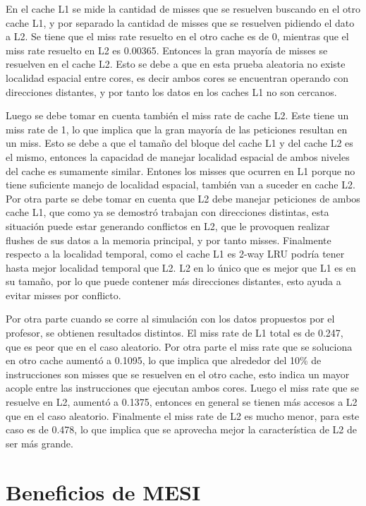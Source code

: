 \documentclass {article}
\begin{document}
En el cache L1 se mide la cantidad de misses que se
resuelven buscando en el otro cache L1, y por separado la cantidad de misses que se resuelven
pidiendo el dato a L2. Se tiene que el miss rate resuelto en el otro cache es de 0, mientras que el
miss rate resuelto en L2 es 0.00365. Entonces la gran mayoría de misses se resuelven en el cache
L2. Esto se debe a que en esta prueba aleatoria no existe localidad espacial entre cores, es decir
ambos cores se encuentran operando con direcciones distantes, y por tanto los datos en los caches L1
no son cercanos.

Luego se debe tomar en cuenta también el miss rate de cache L2. Este tiene un miss rate de 1, lo que
implica que la gran mayoría de las peticiones resultan en un miss. Esto se debe a que el tamaño del
bloque del cache L1 y del cache L2 es el mismo, entonces la capacidad de manejar localidad espacial
de ambos niveles del cache es sumamente similar. Entones los misses que ocurren en L1 porque no tiene
suficiente manejo de localidad espacial, también van a suceder en cache L2. Por otra parte se debe
tomar en cuenta que L2 debe manejar peticiones de ambos cache L1, que como ya se demostró trabajan
con direcciones distintas, esta situación puede estar generando conflictos en L2, que le provoquen
realizar flushes de sus datos a la memoria principal, y por tanto misses. Finalmente respecto a la
localidad temporal, como el cache L1 es 2-way LRU podría tener hasta mejor localidad temporal que
L2. L2 en lo único que es mejor que L1 es en su tamaño, por lo que puede contener más direcciones
distantes, esto ayuda a evitar misses por conflicto.

Por otra parte cuando se corre al simulación con los datos propuestos por el profesor, se obtienen
resultados distintos. El miss rate de L1 total es de 0.247, que es peor que en el caso
aleatorio. Por otra parte el miss rate que se soluciona en otro cache aumentó a 0.1095, lo que
implica que alrededor del 10\% de instrucciones son misses que se resuelven en el otro cache, esto
indica un mayor acople entre las instrucciones que ejecutan ambos cores. Luego
el miss rate que se resuelve en L2, aumentó a 0.1375, entonces en general se tienen más accesos a L2
que en el caso aleatorio. Finalmente el miss rate de L2 es mucho menor, para este caso es de 0.478,
lo que implica que se aprovecha mejor la característica de L2 de ser más grande. 

\section{Beneficios de MESI}
\end{document}
